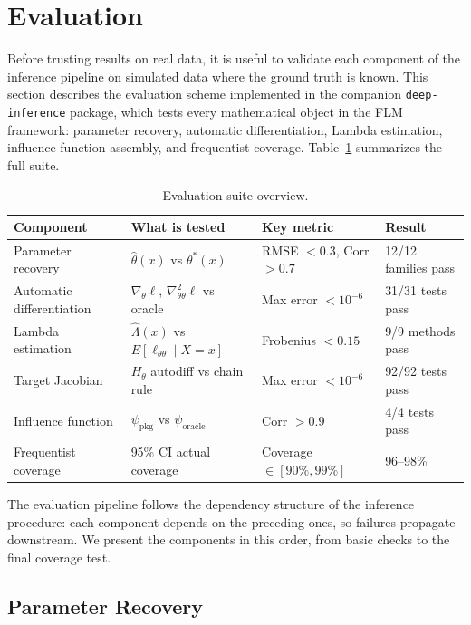 \section{Evaluation}\label{sec:evaluation}

Before trusting results on real data, it is useful to validate each component of the inference pipeline on simulated data where the ground truth is known. This section describes the evaluation scheme implemented in the companion \texttt{deep-inference} package, which tests every mathematical object in the FLM framework: parameter recovery, automatic differentiation, Lambda estimation, influence function assembly, and frequentist coverage. Table~\ref{tab:eval_overview} summarizes the full suite.

\begin{table}[ht]
\centering
\caption{Evaluation suite overview.}\label{tab:eval_overview}
\begin{tabular}{llll}
\toprule
\textbf{Component} & \textbf{What is tested} & \textbf{Key metric} & \textbf{Result} \\
\midrule
Parameter recovery  & $\hat{\theta}(x)$ vs $\theta^*(x)$ & RMSE $< 0.3$, Corr $> 0.7$ & 12/12 families pass \\
Automatic differentiation & $\nabla_\theta \ell$, $\nabla^2_{\theta\theta} \ell$ vs oracle & Max error $< 10^{-6}$ & 31/31 tests pass \\
Lambda estimation   & $\hat{\Lambda}(x)$ vs $E[\ell_{\theta\theta} \mid X\!=\!x]$ & Frobenius $< 0.15$ & 9/9 methods pass \\
Target Jacobian     & $H_\theta$ autodiff vs chain rule & Max error $< 10^{-6}$ & 92/92 tests pass \\
Influence function  & $\psi_{\text{pkg}}$ vs $\psi_{\text{oracle}}$ & Corr $> 0.9$ & 4/4 tests pass \\
Frequentist coverage & 95\% CI actual coverage & Coverage $\in [90\%, 99\%]$ & 96--98\% \\
\bottomrule
\end{tabular}
\end{table}

The evaluation pipeline follows the dependency structure of the inference procedure: each component depends on the preceding ones, so failures propagate downstream. We present the components in this order, from basic checks to the final coverage test.

\subsection{Parameter Recovery}\label{sec:eval_recovery}

